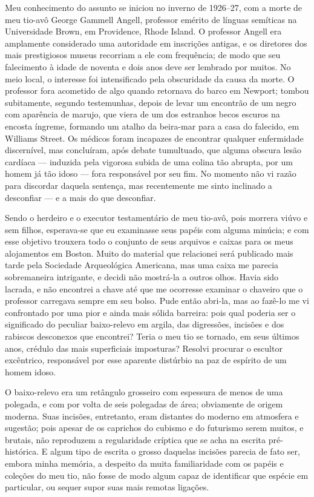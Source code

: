 Meu conhecimento do assunto se iniciou no inverno de 1926--27, com a
morte de meu tio-avô George Gammell Angell, professor emérito de línguas
semíticas na Universidade Brown, em Providence, Rhode Island. O
professor Angell era amplamente considerado uma autoridade em inscrições
antigas, e os diretores dos mais prestigiosos museus recorriam a ele com
frequência; de modo que seu falecimento à idade de noventa e dois anos
deve ser lembrado por muitos. No meio local, o interesse foi
intensificado pela obscuridade da causa da morte. O professor fora
acometido de algo quando retornava do barco em Newport; tombou
subitamente, segundo testemunhas, depois de levar um encontrão de um
negro com aparência de marujo, que viera de um dos estranhos becos
escuros na encosta íngreme, formando um atalho da beira-mar para a casa
do falecido, em Williams Street. Os médicos foram incapazes de encontrar
qualquer enfermidade discernível, mas concluíram, após debate
tumultuado, que alguma obscura lesão cardíaca --- induzida pela vigorosa
subida de uma colina tão abrupta, por um homem já tão idoso --- fora
responsável por seu fim. No momento não vi razão para discordar daquela
sentença, mas recentemente me sinto inclinado a desconfiar --- e a mais 
do que desconfiar. 


Sendo o herdeiro e o executor testamentário de meu tio-avô, pois morrera
viúvo e sem filhos, esperava-se que eu examinasse seus papéis com alguma
minúcia; e com esse objetivo trouxera todo o conjunto de seus arquivos e
caixas para os meus alojamentos em Boston. Muito do material que
relacionei será publicado mais tarde pela Sociedade Arqueológica
Americana, mas uma caixa me parecia sobremaneira intrigante, e decidi
não mostrá-la a outros olhos. Havia sido lacrada, e não encontrei a
chave até que me ocorresse examinar o chaveiro que o professor carregava
sempre em seu bolso. Pude então abri-la, mas ao fazê-lo me vi
confrontado por uma pior e ainda mais sólida barreira: pois qual poderia
ser o significado do peculiar baixo-relevo em argila, das digressões,
incisões e dos rabiscos desconexos que encontrei? Teria o meu tio se
tornado, em seus últimos anos, crédulo das mais superficiais imposturas?
Resolvi procurar o escultor excêntrico, responsável por esse aparente
distúrbio na paz de espírito de um homem idoso.

O baixo-relevo era um retângulo grosseiro com espessura de menos de uma
polegada, e com por volta de seis polegadas de área; obviamente de
origem moderna. Suas incisões, entretanto, eram distantes do moderno em
atmosfera e sugestão; pois apesar de os caprichos do cubismo e do
futurismo serem muitos, e brutais, não reproduzem a regularidade
críptica que se acha na escrita pré-histórica. E algum tipo de escrita o
grosso daquelas incisões parecia de fato ser, embora minha memória, a
despeito da muita familiaridade com os papéis e coleções do meu tio, não
fosse de modo algum capaz de identificar que espécie em particular, ou
sequer supor suas mais remotas ligações.

